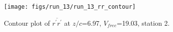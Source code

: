 \begin{figure}[H]
\centering
\texttt{[image: figs/run\_13/run\_13\_rr\_contour]}
\caption{Contour plot of $\overline{r^\prime r^\prime}$ at $z/c$=6.97, $V_{free}$=19.03, station 2.}
\label{fig:run_13_rr_contour}
\end{figure}


